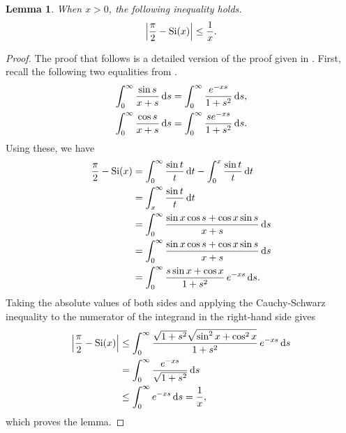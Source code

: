 \documentclass[pdflatex,sn-mathphys-num]{sn-jnl}%
\theoremstyle{thmstyleone}%
\theoremstyle{thmstyletwo}%
\newtheorem{lemma}{Lemma}%
\theoremstyle{thmstylethree}%
\begin{document}
\begin{appendices}
\begin{lemma}
\label{LemA-1}
When $x>0$, the following inequality holds.
\begin{equation}
\left|\frac{\pi}{2}-{\rm Si}(x)\right| \le \frac{1}{x}.
\end{equation}
\end{lemma}
\begin{proof}
The proof that follows is a detailed version of the proof given in \cite{stackexchange}. First, recall the following two equalities from \cite[Eqs.~5.2.12 and 5.2.13]{Abramowitz65}.
\begin{align}
\int_0^{\infty}\frac{\sin s}{x+s}\,{\rm d}s &= \int_0^{\infty}\frac{e^{-xs}}{1+s^2}\,{\rm d}s, \\
\int_0^{\infty}\frac{\cos s}{x+s}\,{\rm d}s &= \int_0^{\infty}\frac{se^{-xs}}{1+s^2}\,{\rm d}s.
\end{align}
Using these, we have
\begin{align}
\frac{\pi}{2}-{\rm Si}(x) &= \int_0^{\infty}\frac{\sin t}{t}\,{\rm d}t-\int_0^x\frac{\sin t}{t}\,{\rm d}t \nonumber \\
&= \int_x^{\infty}\frac{\sin t}{t}\,{\rm d}t \nonumber \\
&= \int_0^{\infty}\frac{\sin x\cos s+\cos x\sin s}{x+s}\,{\rm d}s \nonumber \\
&= \int_0^{\infty}\frac{\sin x\cos s+\cos x\sin s}{x+s}\,{\rm d}s \nonumber \\
&= \int_0^{\infty}\frac{s\sin x+\cos x}{1+s^2}\,e^{-xs}\,{\rm d}s.
\end{align}
Taking the absolute values of both sides and applying the Cauchy-Schwarz inequality to the numerator of the integrand in the right-hand side gives
\begin{align}
\left|\frac{\pi}{2}-{\rm Si}(x)\right| &\le \int_0^{\infty}\frac{\sqrt{1+s^2}\sqrt{\sin^2 x+\cos^2 x}}{1+s^2}\,e^{-xs}\,{\rm d}s \nonumber \\
&= \int_0^{\infty}\frac{e^{-xs}}{\sqrt{1+s^2}}\,{\rm d}s \nonumber \\
&\le \int_0^{\infty}e^{-xs}\,{\rm d}s = \frac{1}{x},
\end{align}
which proves the lemma.
\end{proof}




\end{appendices}
\end{document}
